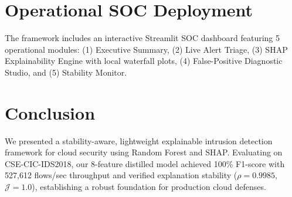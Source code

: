 \documentclass[conference]{IEEEtran}
\begin{document}
\section{Operational SOC Deployment}
The framework includes an interactive Streamlit SOC dashboard featuring 5 operational modules: (1) Executive Summary, (2) Live Alert Triage, (3) SHAP Explainability Engine with local waterfall plots, (4) False-Positive Diagnostic Studio, and (5) Stability Monitor.

\section{Conclusion}
We presented a stability-aware, lightweight explainable intrusion detection framework for cloud security using Random Forest and SHAP. Evaluating on CSE-CIC-IDS2018, our 8-feature distilled model achieved 100\% F1-score with 527,612 flows/sec throughput and verified explanation stability ($\rho = 0.9985$, $\mathcal{J} = 1.0$), establishing a robust foundation for production cloud defenses.
\end{document}
